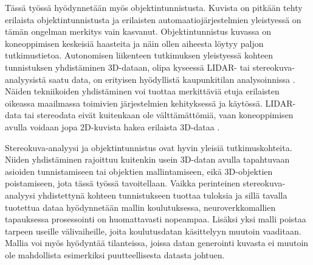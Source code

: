 Tässä työssä hyödynnetään myös objektintunnistusta.  
Kuvista on pitkään tehty erilaista objektintunnistusta ja erilaisten automaatiojärjestelmien yleistyessä on tämän ongelman merkitys vain kasvanut.
Objektintunnistus kuvassa on koneoppimisen keskeisiä haasteita ja näin ollen aiheesta löytyy paljon tutkimustietoa.
Autonomisen liikenteen tutkimuksen yleistyessä kohteen tunnistuksen yhdistäminen 3D-dataan,
olipa kyseessä LIDAR- tai stereokuva-analyysistä saatu data, on erityisen hyödyllistä kaupunkitilan analysoinnissa \cite{MengZeYu2024TODf}.
Näiden tekniikoiden yhdistäminen voi tuottaa merkittäviä etuja erilaisten oikeassa maailmassa toimivien järjestelmien kehityksessä ja käytössä.  
LIDAR-data tai stereodata eivät kuitenkaan ole välttämättömiä, vaan koneoppimisen avulla voidaan jopa 2D-kuvista hakea erilaista 3D-dataa \cite{MaXinzhu20243ODF}.  

Stereokuva-analyysi ja objektintunnistus ovat hyvin yleisiä tutkimuskohteita.  
Niiden yhdistäminen rajoittuu kuitenkin usein 3D-datan avulla tapahtuvaan asioiden tunnistamiseen tai objektien mallintamiseen, eikä 3D-objektien poistamiseen, jota tässä työssä tavoitellaan.  
Vaikka perinteinen stereokuva-analyysi yhdistettynä kohteen tunnistukseen tuottaa tuloksia ja sillä tavalla tuotettua dataa hyödynnetään mallin koulutuksessa, neuroverkkomallien tapauksessa prosessointi on huomattavasti nopeampaa.  
Lisäksi yksi malli poistaa tarpeen useille välivaiheille, joita koulutusdatan käsittelyyn muutoin vaaditaan.  
Mallia voi myös hyödyntää tilanteissa, joissa datan generointi kuvasta ei muutoin ole mahdollista esimerkiksi puutteellisesta datasta johtuen. 
